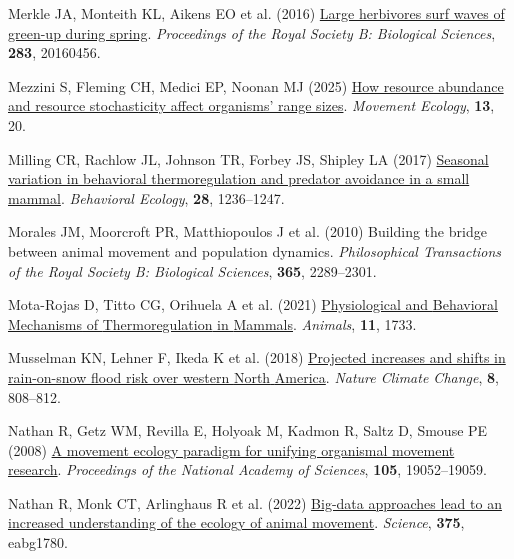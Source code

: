 \documentclass[
  12pt,
]{article}
\newlength{\cslhangindent}
\newenvironment{CSLReferences}[2] %
 {\begin{list}{}{%
  \setlength{\itemindent}{0pt}
  \setlength{\leftmargin}{0pt}
  \setlength{\parsep}{0pt}
  \ifodd #1
   \setlength{\leftmargin}{\cslhangindent}
   \setlength{\itemindent}{-1\cslhangindent}
  \fi
  \setlength{\itemsep}{#2\baselineskip}}}
 {\end{list}}
\begin{document}
\begin{CSLReferences}{1}{0}
Merkle JA, Monteith KL, Aikens EO et al. (2016) \href{https://doi.org/10.1098/rspb.2016.0456}{Large herbivores surf waves of green-up during spring}. \emph{Proceedings of the Royal Society B: Biological Sciences}, \textbf{283}, 20160456.

Mezzini S, Fleming CH, Medici EP, Noonan MJ (2025) \href{https://doi.org/10.1186/s40462-025-00546-5}{How resource abundance and resource stochasticity affect organisms' range sizes}. \emph{Movement Ecology}, \textbf{13}, 20.

Milling CR, Rachlow JL, Johnson TR, Forbey JS, Shipley LA (2017) \href{https://doi.org/10.1093/beheco/arx084}{Seasonal variation in behavioral thermoregulation and predator avoidance in a small mammal}. \emph{Behavioral Ecology}, \textbf{28}, 1236--1247.

Morales JM, Moorcroft PR, Matthiopoulos J et al. (2010) Building the bridge between animal movement and population dynamics. \emph{Philosophical Transactions of the Royal Society B: Biological Sciences}, \textbf{365}, 2289--2301.

Mota-Rojas D, Titto CG, Orihuela A et al. (2021) \href{https://doi.org/10.3390/ani11061733}{Physiological and {Behavioral} {Mechanisms} of {Thermoregulation} in {Mammals}}. \emph{Animals}, \textbf{11}, 1733.

Musselman KN, Lehner F, Ikeda K et al. (2018) \href{https://doi.org/10.1038/s41558-018-0236-4}{Projected increases and shifts in rain-on-snow flood risk over western {North} {America}}. \emph{Nature Climate Change}, \textbf{8}, 808--812.

Nathan R, Getz WM, Revilla E, Holyoak M, Kadmon R, Saltz D, Smouse PE (2008) \href{https://doi.org/10.1073/pnas.0800375105}{A movement ecology paradigm for unifying organismal movement research}. \emph{Proceedings of the National Academy of Sciences}, \textbf{105}, 19052--19059.

Nathan R, Monk CT, Arlinghaus R et al. (2022) \href{https://doi.org/10.1126/science.abg1780}{Big-data approaches lead to an increased understanding of the ecology of animal movement}. \emph{Science}, \textbf{375}, eabg1780.


\end{CSLReferences}
\end{document}
